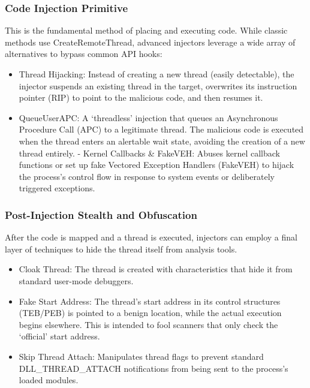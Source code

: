 \documentclass[journal]{IEEEtran}
\begin{document}
\subsubsection{Code Injection Primitive}
This is the fundamental method of placing and executing code. While classic methods use CreateRemoteThread, advanced injectors leverage a wide array of alternatives to bypass common API hooks:
\begin{itemize}
\item Thread Hijacking: Instead of creating a new thread (easily detectable), the injector suspends an existing thread in the target, overwrites its instruction pointer (RIP) to point to the malicious code, and then resumes it.
\item QueueUserAPC: A `threadless' injection that queues an Asynchronous Procedure Call (APC) to a legitimate thread. The malicious code is executed when the thread enters an alertable wait state, avoiding the creation of a new thread entirely.
- Kernel Callbacks \& FakeVEH: Abuses kernel callback functions or set up fake Vectored Exception Handlers (FakeVEH) to hijack the process's control flow in response to system events or deliberately triggered exceptions.
\end{itemize}
\subsubsection{Post-Injection Stealth and Obfuscation}
After the code is mapped and a thread is executed, injectors can employ a final layer of techniques to hide the thread itself from analysis tools.
\begin{itemize}
\item Cloak Thread: The thread is created with characteristics that hide it from standard user-mode debuggers.
\item Fake Start Address: The thread's start address in its control structures (TEB/PEB) is pointed to a benign location, while the actual execution begins elsewhere. This is intended to fool scanners that only check the `official' start address.
\item Skip Thread Attach: Manipulates thread flags to prevent standard DLL\_THREAD\_ATTACH notifications from being sent to the process's loaded modules.
\end{itemize}
\end{document}
